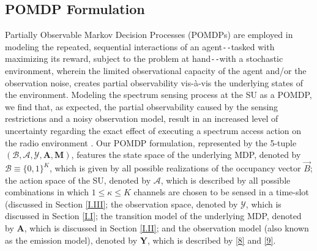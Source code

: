 \documentclass[12pt, draftcls, onecolumn]{IEEEtran}
\begin{document}
\subsection{POMDP Formulation}\label{I.IV}
Partially Observable Markov Decision Processes (POMDPs) are employed in modeling the repeated, sequential interactions of an agent\texttt{-{}-}tasked with maximizing its reward, subject to the problem at hand\texttt{-{}-}with a stochastic environment, wherein the limited observational capacity of the agent and/or the observation noise, creates partial observability vis-\`{a}-vis the underlying states of the environment. Modeling the spectrum sensing process at the SU as a POMDP, we find that, as expected, the partial observability caused by the sensing restrictions and a noisy observation model, result in an increased level of uncertainty regarding the exact effect of executing a spectrum access action on the radio environment \cite{WCL:paper}. Our POMDP formulation, represented by the 5-tuple $(\mathcal{B},\mathcal{A},\mathcal{Y},\mathbf{A},\mathbf{M})$, features the state space of the underlying MDP, denoted by $\mathcal{B}{\equiv}\{0,1\}^{K}$, which is given by all possible realizations of the occupancy vector $\vec{B}$; the action space of the SU, denoted by $\mathcal{A}$, which is described by all possible combinations in which $1{\leq}\kappa{\leq}K$ channels are chosen to be sensed in a time-slot (discussed in Section \ref{I.III}; the observation space, denoted by $\mathcal{Y}$, which is discussed in Section \ref{I.I}; the transition model of the underlying MDP, denoted by $\mathbf{A}$, which is discussed in Section \ref{I.II}; and the observation model (also known as the emission model), denoted by $\mathbf{Y}$, which is described by \eqref{8} and \eqref{9}.
\end{document}
